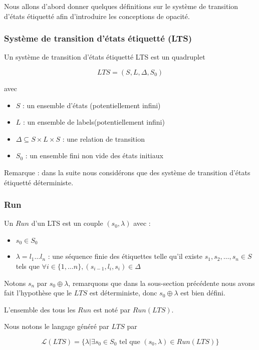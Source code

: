 \documentclass[10pt,a4paper]{article}
\begin{document}
Nous allons d'abord donner quelques d\'efinitions sur le syst\`eme de transition d'\'etats \'etiquett\'e afin d'introduire les conceptions de opacit\'e.

\subsubsection{Syst\`eme de transition d'\'etats \'etiquett\'e (LTS)}

Un syst\`eme de transition d'\'etats \'etiquett\'e LTS est un quadruplet 

$$LTS = (S,L,\Delta,S_0)$$

avec
\begin{itemize}
	\item $S$ : un ensemble d'\'etats (potentiellement infini)
	\item $L$ : un ensemble de labels(potentiellement infini)
	\item $\Delta \subseteq S\times L \times S$ : une relation de transition
	\item $S_0$ : un ensemble fini non vide des \'etats initiaux 
\end{itemize}

Remarque : dans la suite nous consid\'erons que des syst\`eme de transition d'\'etats \'etiquett\'e d\'eterministe.

\subsubsection{Run}	

Un $Run$ d'un LTS est un couple $(s_0,\lambda)$ avec :

\begin{itemize}
	\item $s_0 \in S_0$
	\item $\lambda = l_1 \dots l_n$ : une s\'equence finie des \'etiquettes telle qu'il existe $s_1,s_2,\dots ,s_n \in S$ tels que $\forall i \in \{1, \dots n\}, (s_{i-1},l_i,s_i) \in \Delta$ 
\end{itemize}

Notons $s_n$ par $s_0\oplus \lambda$, remarquons que dans la sous-section pr\'ec\'edente nous avons fait l'hypoth\`ese que le $LTS$ est d\'eterministe, donc $s_0\oplus \lambda$ est bien d\'efini.

L'ensemble des tous les $Run$ est not\'e par $Run(LTS)$.

Nous notons le langage g\'en\'er\'e par $LTS$ par 

$$\mathcal{L}(LTS) = \{\lambda | \exists s_0 \in S_0 \mbox{ tel que } (s_0,\lambda) \in Run(LTS)\}$$
\end{document}

